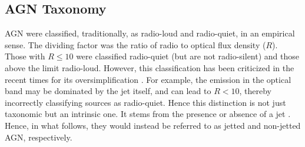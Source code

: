  \subsection{AGN Taxonomy \label{sec:taxonomy}}
AGN were classified, traditionally, as radio-loud and radio-quiet, in an empirical sense. The dividing factor was the ratio of radio to optical flux density ($R$). Those with $R\leq10$ were classified radio-quiet (but are not radio-silent) and those above the limit radio-loud. However, this classification has been criticized in the recent times for its oversimplification \citep[e.g.,][]{Padovani_2016}. For example, the emission in the optical band may be dominated by the jet itself, and can lead to $R<10$, thereby incorrectly classifying sources as radio-quiet. Hence this distinction is not just taxonomic but an intrinsic one. It stems from the presence or absence of a jet \citep{Padovani_2017}. Hence, in what follows, they would instead be referred to as jetted and non-jetted AGN, respectively.
